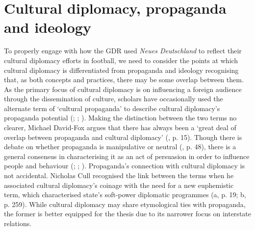 \section{Cultural diplomacy, propaganda and ideology}

To properly engage with how the GDR used \textit{Neues Deutschland} to reflect their cultural diplomacy efforts in football, we need to consider the points at which cultural diplomacy is differentiated from propaganda and ideology recognising that, as both concepts and practices, there may be some overlap between them. As the primary focus of cultural diplomacy is on influencing a foreign audience through the dissemination of culture, scholars have occasionally used the alternate term of ‘cultural propaganda’ to describe cultural diplomacy’s propaganda potential (\cite{prevots1998}; \cite{david-fox2011}; \cite{faircloughwiggins2016}). Making the distinction between the two terms no clearer, Michael David-Fox argues that there has always been a ‘great deal of overlap between propaganda and cultural diplomacy’ (\citeyear{david-fox2011}, p. 15). Though there is debate on whether propaganda is manipulative or neutral (\cite{diggs-brown2011}, p. 48), there is a general consensus in characterising it as an act of persuasion in order to influence people and behaviour (\cite{blackroberts2011}; \cite{auerbachcastronovo2013}; \cite{milleretal2016}). Propaganda’s connection with cultural diplomacy is not accidental. Nicholas Cull recognised the link between the terms when he associated cultural diplomacy’s coinage with the need for a new euphemistic term, which characterised state’s soft-power diplomatic programmes (\citeyear{cull2008a}a, p. 19; \citeyear{cull2008b}b, p. 259). While cultural diplomacy may share etymological ties with propaganda, the former is better equipped for the thesis due to its narrower focus on interstate relations.


